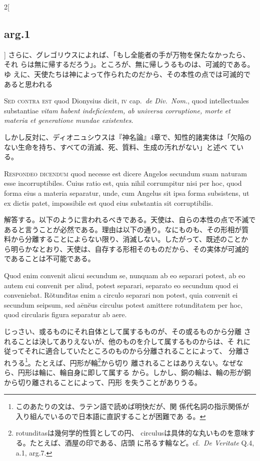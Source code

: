 \documentclass[paper=a4paper,fontsize=10pt,jafontsize=9pt,titlepage]{jlreq}
\begin{document}
\begin{paracol}{2}[\subsection{arg.1}]
さらに、グレゴリウスによれば、「もし全能者の手が万物を保たなかったら、それ
 らは無に帰するだろう」。ところが、無に帰しうるものは、可滅的である。ゆ
 えに、天使たちは神によって作られたのだから、その本性の点では可滅的で
 あると思われる

\switchcolumn*[\subsection{s.c.}]

{\scshape Sed contra est} quod Dionysius dicit, {\scshape iv}
cap.~{\itshape de Div.~Nom.}, quod intellectuales substantiae {\itshape
vitam habent indeficientem, ab universa corruptione, morte et materia et
generatione mundae existentes}.

\switchcolumn

しかし反対に、ディオニュシウスは『神名論』4章で、知性的諸実体は「欠陥の
 ない生命を持ち、すべての消滅、死、質料、生成の汚れがない」と述べ
 ている。


{\scshape Respondeo dicendum} quod necesse est dicere
Angelos secundum suam naturam esse incorruptibiles. Cuius ratio est,
quia nihil corrumpitur nisi per hoc, quod forma eius a materia
separatur, unde, cum Angelus sit ipsa forma subsistens, ut ex dictis
patet, impossibile est quod eius substantia sit corruptibilis.

\switchcolumn

解答する。以下のように言われるべきである。天使は、自らの本性の点で不滅で
 あると言うことが必然である。理由は以下の通り。なにものも、その形相が質
 料から分離することによらない限り、消滅しない。したがって、既述のことか
 ら明らかなとおり、天使は、自存する形相そのものだから、その実体が可滅的
 であることは不可能である。

\switchcolumn*

Quod enim convenit alicui secundum se, nunquam ab eo separari potest,
ab eo autem cui convenit per aliud, potest separari, separato eo
secundum quod ei conveniebat. R\u{o}tund\u{\i}tas enim a circulo
separari non potest, quia convenit ei secundum seipsum, sed
a\={e}n\u{e}us circulus potest amittere rotunditatem per hoc, quod
circularis figura separatur ab aere.

\switchcolumn

じっさい、或るものにそれ自体として属するものが、その或るものから分離
 されることは決してありえないが、他のものを介して属するものからは、そ
 れに従ってそれに適合していたところのものから分離されることによって、
 分離されうる\footnote{このあたりの文は、ラテン語で読めば明快だが、関
 係代名詞の指示関係が入り組んでいるので日本語に直訳することが困難であ
 る。}。たとえば、円形が輪\footnote{rotunditasは幾何学的性質としての円、
 circulusは具体的な丸いものを意味する。たとえば、酒屋の印である、店頭
 に吊るす輪など。cf.~{\itshape De Veritate} Q.4, a.1, arg.7.}から切り
 離されることはありえない。なぜなら、円形は輪に、輪自身に即して属する
 から。しかし、銅の輪は、輪の形が銅から切り離されることによって、円形
 を失うことがありうる。


\end{paracol}
\end{document}
